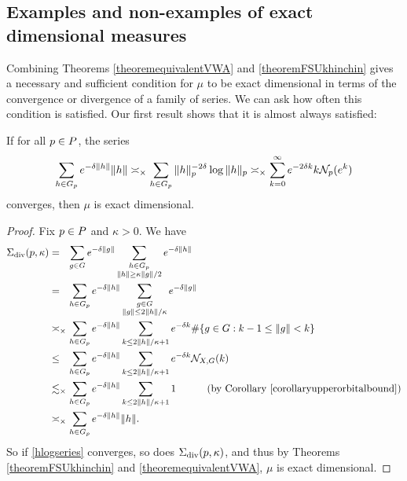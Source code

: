 \subsection{Examples and non-examples of exact dimensional measures}
Combining Theorems \ref{theoremequivalentVWA} and \ref{theoremFSUkhinchin} gives a necessary and sufficient condition for $\mu$ to be exact dimensional in terms of the convergence or divergence of a family of series. We can ask how often this condition is satisfied. Our first result shows that it is almost always satisfied:

\begin{theorem}
\label{theoremhlogseries}
If for all $p\in P$, the series
\begin{equation}
\label{hlogseries}
\sum_{h\in G_p} e^{-\delta\|h\|} \|h\|
\asymp_\times \sum_{h\in G_p} \|h\|_p^{-2\delta} \log\|h\|_p
\asymp_\times \sum_{k = 0}^\infty e^{-2\delta k} k \mathcal N_p(e^k)
\end{equation}
converges, then $\mu$ is exact dimensional.
\end{theorem}
\begin{proof}
Fix $p\in P$ and $\kappa > 0$. We have
\begin{align*}
\SigmaVWA(\bp,\kappa)
&=_\pt \sum_{g\in G} e^{-\delta\dogo g} \sum_{\substack{h\in G_\bp \\ \dogo h \geq \kappa\dogo g/2}} e^{-\delta\dogo h}\\
&=_\pt \sum_{h\in G_\bp} e^{-\delta\dogo h} \sum_{\substack{g\in G \\ \dogo g \leq 2\dogo h/\kappa}} e^{-\delta\dogo g}\\
&\asymp_\times \sum_{h\in G_\bp} e^{-\delta\dogo h} \sum_{k\leq 2\dogo h/\kappa + 1} e^{-\delta k} \#\{g\in G : k - 1 \leq \dogo g < k\} \noreason\\
&\leq_\pt \sum_{h\in G_\bp} e^{-\delta\dogo h} \sum_{k\leq 2\dogo h/\kappa + 1} e^{-\delta k} \NN_{X,G}(k) \noreason\\
&\lesssim_\times \sum_{h\in G_\bp} e^{-\delta\dogo h} \sum_{k\leq 2\dogo h/\kappa + 1} 1 \by{Corollary \ref{corollaryupperorbitalbound}}\\
&\asymp_\times \sum_{h\in G_\bp} e^{-\delta\dogo h} \dogo h.
\end{align*}
So if \eqref{hlogseries} converges, so does $\Sigma_{\textup{div}}(p,\kappa)$, and thus by Theorems \ref{theoremFSUkhinchin} and \ref{theoremequivalentVWA}, $\mu$ is exact dimensional.
\end{proof}

